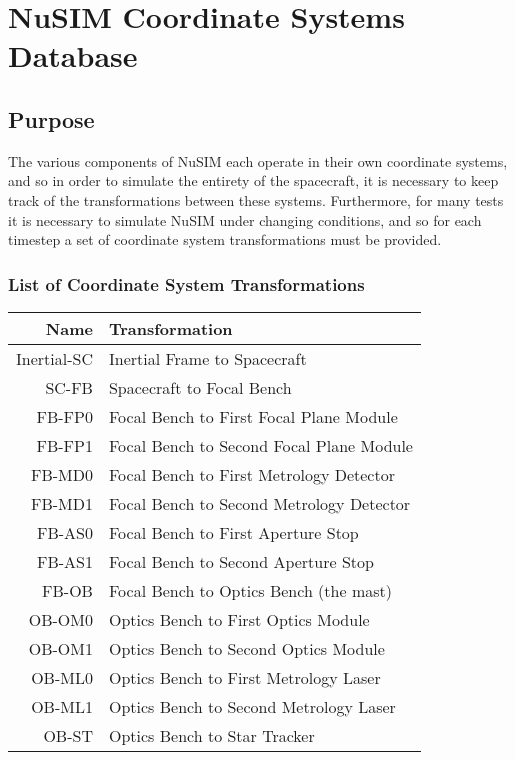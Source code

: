 

%



\chapter{NuSIM Coordinate Systems Database}
\section{Purpose}
The various components of NuSIM each operate in their own coordinate systems, and so in order to simulate the entirety of the spacecraft, it is necessary to keep track of the transformations between these systems. Furthermore, for many tests it is necessary to simulate NuSIM under changing conditions, and so for each timestep a set of coordinate system transformations must be provided. 

\subsection{List of Coordinate System Transformations}


\begin{tabular}{| r | l |}
\hline
{\bf Name}	&	{\bf Transformation}						\\
\hline
Inertial-SC	&	Inertial Frame to Spacecraft				\\
SC-FB		&	Spacecraft to Focal Bench				\\
FB-FP0		&	Focal Bench to First Focal Plane Module		\\
FB-FP1		&	Focal Bench to Second Focal Plane Module	\\
FB-MD0		&	Focal Bench to First Metrology Detector		\\
FB-MD1		&	Focal Bench to Second Metrology Detector	\\
FB-AS0		&	Focal Bench to First Aperture Stop			\\
FB-AS1		&	Focal Bench to Second Aperture Stop		\\
FB-OB		&	Focal Bench to Optics Bench (the mast)		\\
OB-OM0		&	Optics Bench to First Optics Module			\\
OB-OM1		&	Optics Bench to Second Optics Module		\\
OB-ML0		&	Optics Bench to First Metrology Laser		\\
OB-ML1		&	Optics Bench to Second Metrology Laser		\\
OB-ST		&	Optics Bench to Star Tracker				\\
\hline
\end{tabular}


